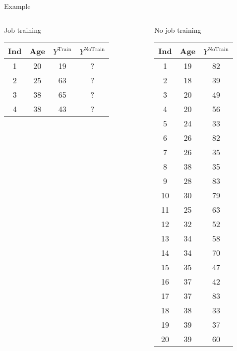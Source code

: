 \documentclass{beamer}
\begin{document}
\begin{frame}[t]{Example} 
\begin{columns}
    \begin{column}{.4\textwidth}
\begin{table}[t]
\centering
Job training
\small
\begin{tabular}{c|ccc}
  \hline
Ind & Age  & $Y^{\text{Train}}$ & $Y^{\text{NoTrain}}$ \\ 
  \hline
1 & 20  & 19 & ? \\ 
  2 & 25 & 63 & ? \\ 
  3 & 38  & 65 & ? \\ 
4 & 38  & 43 & ? \\ 
  
\end{tabular}
\end{table}
\end{column}
    ~
\begin{column}{.4\textwidth}
\pause 

\begin{table}[t]
\centering
No job training
\scriptsize
\begin{tabular}{c|cc}
  \hline
Ind & Age & $Y^{\text{NoTrain}}$ \\ 
  \hline
1 & 19 & 82 \\ \hline
  2 & 18 & 39 \\ \hline
  3 & 20 & 49 \\ \hline
  4 & 20 & 56 \\ \hline
  5 & 24 & 33 \\ \hline
  6 & 26 & 82 \\ \hline
  7 & 26 & 35 \\ \hline
  8 & 38 & 35 \\ \hline
  9 & 28 & 83 \\ \hline
  10 & 30 & 79 \\ \hline
  11 & 25 & 63 \\ \hline
  12 & 32 & 52 \\ \hline
  13 & 34 & 58 \\ \hline
  14 & 34 & 70 \\ \hline
  15 & 35 & 47 \\ \hline
  16 & 37 & 42 \\ \hline
  17 & 37 & 83 \\ \hline
  18 & 38 & 33 \\ \hline
  19 & 39 & 37 \\ \hline
  20 & 39 & 60 \\ \hline
\end{tabular}
\end{table}
    \end{column}
    
\end{columns}
\end{frame}
\end{document}
